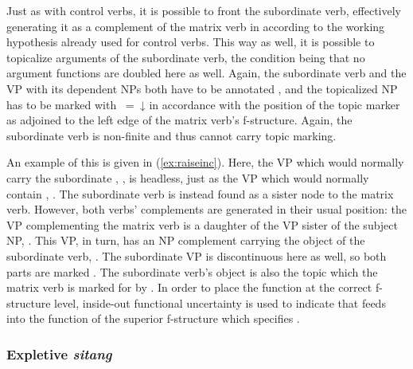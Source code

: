 Just as with control verbs, it is possible to front the subordinate verb,
effectively generating it as a complement of the matrix verb in 
according to the working hypothesis already used for control verbs. This way as
well, it is possible to topicalize arguments of the subordinate verb, the
condition being that no argument functions are doubled here as well. Again, the
subordinate verb and the VP with its dependent NPs both have to be annotated
\pass{\XCompl}, and the topicalized NP has to be marked with
\uncertain{\XCompl}{\Top}~=~↓ in accordance with the position of the topic
marker as adjoined to the left edge of the matrix verb's f-structure. Again,
the subordinate verb is non-finite and thus cannot carry topic marking.

An example of this is given in (\ref{ex:raiseinc}). Here, the VP which would
normally carry the subordinate , , is
headless, just as the VP which would normally contain ,
. The subordinate verb is instead found
as a sister node to the matrix verb. However, both verbs' complements are
generated in their usual position: the VP complementing the matrix verb is a
daughter of the VP sister of the subject NP, . This
VP, in turn, has an NP complement carrying the object of the subordinate verb,
. The subordinate VP is discontinuous here as well, so
both parts are marked \XCompl{}. The subordinate verb's object is also the
topic which the matrix verb is marked for by . In order to place
the \Top{} function at the correct f-structure level, inside-out functional
uncertainty is used to indicate that  feeds into the \Top{}
function of the superior f-structure which specifies \XCompl{}.


\subsubsection{Expletive \emph{sitang}}
\label{subsec:expsitang}

